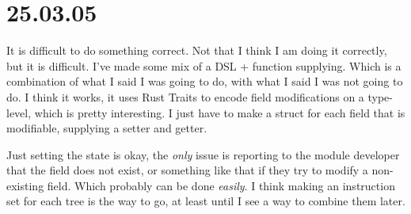 \section{25.03.05}

It is difficult to do something correct. Not that I think I am doing it
correctly, but it is difficult. I've made some mix of a DSL + function
supplying. Which is a combination of what I said I was going to do, with what I
said I was not going to do. I think it works, it uses Rust Traits to encode
field modifications on a type-level, which is pretty interesting. I just have to
make a struct for each field that is modifiable, supplying a setter and getter.

Just setting the state is okay, the \textit{only} issue is reporting to
the module developer that the field does not exist, or something like that if
they try to modify a non-existing field. Which probably can be done
\textit{easily}. I think making an instruction set for each tree is the way to
go, at least until I see a way to combine them later.

